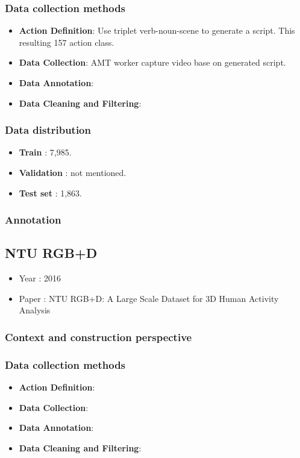 \documentclass[10pt,onecolumn,letterpaper]{article}
\begin{document}
\subsubsection{Data collection methods}
\begin{itemize}
	\item \textbf{Action Definition}: Use triplet verb-noun-scene to generate a script. This resulting 157 action class.
	\item \textbf{Data Collection}: AMT worker capture video base on generated script.
	\item \textbf{Data Annotation}:
	\item \textbf{Data Cleaning and Filtering}:
\end{itemize}
\subsubsection{Data distribution}

\begin{itemize}
	\item  \textbf{Train} : 7,985.
	\item \textbf{Validation} : not mentioned.
	\item \textbf{Test set} : 1,863.
\end{itemize}

\subsubsection{Annotation}

\subsection{NTU RGB+D}

\begin{itemize}
	\item Year : 2016
	\item Paper : NTU RGB+D: A Large Scale Dataset for 3D Human Activity Analysis \cite{NTURGB+D}
\end{itemize}

\subsubsection{Context and construction perspective}
\subsubsection{Data collection methods}
\begin{itemize}
	\item \textbf{Action Definition}:
	\item \textbf{Data Collection}:
	\item \textbf{Data Annotation}:
	\item \textbf{Data Cleaning and Filtering}:
\end{itemize}
\end{document}
